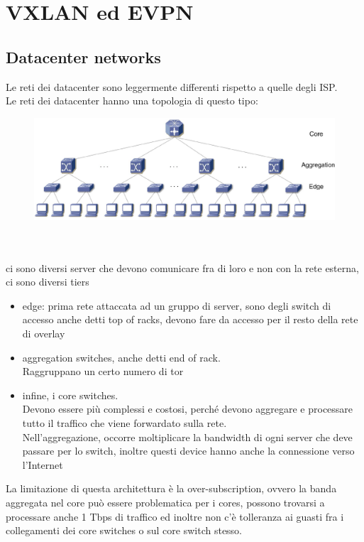 \documentclass[12pt, oneside]{extbook} %
\begin{document}
\chapter*{VXLAN ed EVPN}

\section{Datacenter networks}
Le reti dei datacenter sono leggermente differenti rispetto a quelle degli ISP.
\\Le reti dei datacenter hanno una topologia di questo tipo:\\
\begin{figure}[h!]
    \centering
    \includegraphics[scale=0.5]{../../immagini/dc_topology}
\end{figure}\\\\
ci sono diversi server che devono comunicare fra di loro e non con la rete esterna, ci sono diversi tiers
\begin{itemize}
    \item edge: prima rete attaccata ad un gruppo di server, sono degli switch di accesso anche detti top of racks, devono fare da accesso per il resto della rete di overlay
    \item aggregation switches, anche detti end of rack. 
    \\Raggruppano un certo numero di tor
    \item infine, i core switches.
    \\Devono essere più complessi e costosi, perché devono aggregare e processare tutto il traffico che viene forwardato sulla rete.
    \\Nell'aggregazione, occorre moltiplicare la bandwidth di ogni server che deve passare per lo switch, inoltre questi device hanno anche la connessione verso l'Internet
\end{itemize}
La limitazione di questa architettura è la over-subscription, ovvero la banda aggregata nel core può essere problematica per i cores, possono trovarsi a processare anche 1 Tbps di traffico ed inoltre non c'è tolleranza ai guasti fra i collegamenti dei core switches o sul core switch stesso.
\end{document}
